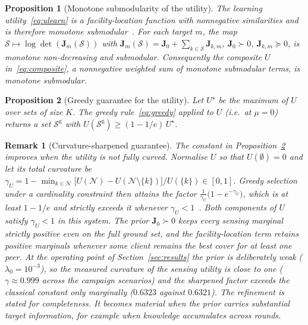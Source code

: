 \documentclass[lettersize,journal]{IEEEtran}
\newtheorem{proposition}{Proposition}
\newtheorem{remark}{Remark}
\newcommand{\bJ}{\bm{J}}
\newcommand{\calS}{\mathcal{S}}
\newcommand{\calN}{\mathcal{N}}
\newcommand{\logdet}{\log\det}
\begin{document}
\begin{proposition}[Monotone submodularity of the utility]\label{prop:submod}
The learning utility~\eqref{eq:ulearn} is a facility-location function with nonnegative similarities and is therefore monotone submodular~\cite{balakrishnan2022divfl,krause2014submodular}. For each target $m$, the map $\calS\mapsto\logdet(\bJ_m(\calS))$ with $\bJ_m(\calS)=\bJ_0+\sum_{k\in\calS}\bJ_{k,m}$, $\bJ_0\succ 0$, $\bJ_{k,m}\succeq 0$, is monotone non-decreasing and submodular. Consequently the composite $U$ in~\eqref{eq:composite}, a nonnegative weighted sum of monotone submodular terms, is monotone submodular.
\end{proposition}

\begin{proposition}[Greedy guarantee for the utility]\label{prop:greedy}
Let $U^\star$ be the maximum of $U$ over sets of size $K$. The greedy rule~\eqref{eq:greedy} applied to $U$ (i.e.\ at $\mu=0$) returns a set $\calS^{\mathrm{g}}$ with $U(\calS^{\mathrm{g}})\ge(1-1/e)\,U^\star$.
\end{proposition}

\begin{remark}[Curvature-sharpened guarantee]\label{rem:curvature}
The constant in Proposition~\ref{prop:greedy} improves when the utility is not fully curved. Normalise $U$ so that $U(\emptyset)=0$ and let its total curvature be
$\gamma_U=1-\min_{k\in\calN}\big[U(\calN)-U(\calN\setminus\{k\})\big]/U(\{k\})\in[0,1]$.
Greedy selection under a cardinality constraint then attains the factor $\frac{1}{\gamma_U}\big(1-e^{-\gamma_U}\big)$, which is at least $1-1/e$ and strictly exceeds it whenever $\gamma_U<1$~\cite{conforti1984}. Both components of $U$ satisfy $\gamma_U<1$ in this system. The prior $\bJ_0\succ 0$ keeps every sensing marginal strictly positive even on the full ground set, and the facility-location term retains positive marginals whenever some client remains the best cover for at least one peer. At the operating point of Section~\ref{sec:results} the prior is deliberately weak ($\lambda_0=10^{-3}$), so the measured curvature of the sensing utility is close to one ($\gamma\approx 0.999$ across the campaign scenarios) and the sharpened factor exceeds the classical constant only marginally ($0.6323$ against $0.6321$). The refinement is stated for completeness. It becomes material when the prior carries substantial target information, for example when knowledge accumulates across rounds.
\end{remark}
\end{document}
